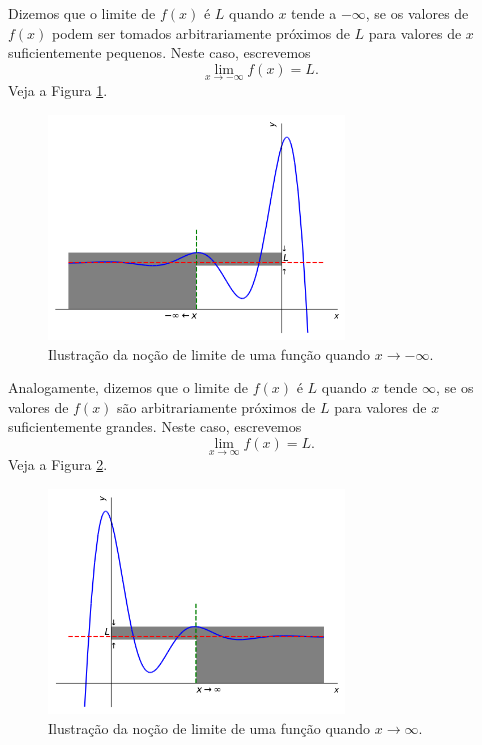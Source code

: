 Dizemos que o limite de $f(x)$ é $L$ quando $x$ tende a $-\infty$, se os valores de $f(x)$ podem ser tomados arbitrariamente próximos de $L$ para valores de $x$ suficientemente pequenos. Neste caso, escrevemos
\begin{equation}
  \lim_{x\to -\infty} f(x) = L.
\end{equation}
Veja a Figura \ref{fig:lim_x-infty}.

\begin{figure}[H]
  \centering
  \includegraphics[width=0.7\textwidth]{./cap_lim/dados/fig_lim_x-infty/fig_lim_x-infty}
  \caption{Ilustração da noção de limite de uma função quando $x\to -\infty$.}
  \label{fig:lim_x-infty}
\end{figure}

Analogamente, dizemos que o limite de $f(x)$ é $L$ quando $x$ tende $\infty$, se os valores de $f(x)$ são arbitrariamente próximos de $L$ para valores de $x$ suficientemente grandes. Neste caso, escrevemos
\begin{equation}
  \lim_{x\to \infty} f(x) = L.
\end{equation}
Veja a Figura \ref{fig:lim_x2infty}.

\begin{figure}[H]
  \centering
  \includegraphics[width=0.7\textwidth]{./cap_lim/dados/fig_lim_x2infty/fig_lim_x2infty}
  \caption{Ilustração da noção de limite de uma função quando $x\to \infty$.}
  \label{fig:lim_x2infty}
\end{figure}


